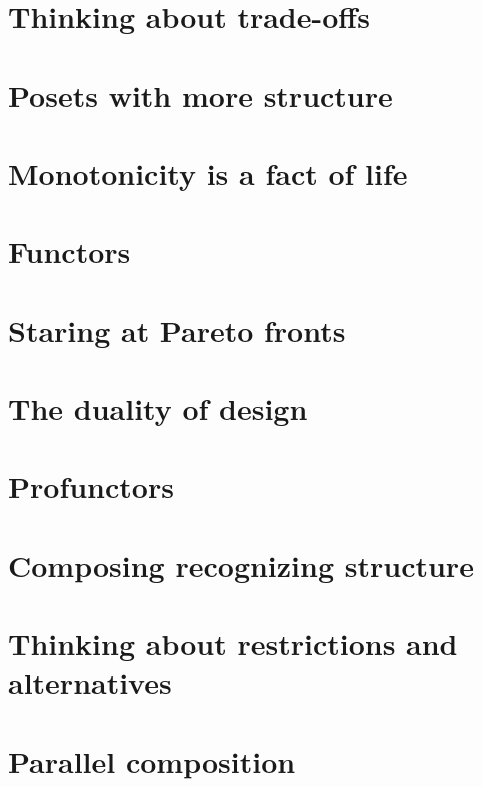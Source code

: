 \documentclass[paper=6in:9in,pagesize=pdftex,
 headinclude=off,footinclude=on,11pt,twoside]{scrbook}
\begin{document}
\chapter{Thinking about trade-offs}

\clearpage
%
\chapter{Posets with more structure}

%
\chapter{Monotonicity is a fact of life}

\clearpage
%
\chapter{Functors}

\clearpage
%
\chapter{Staring at Pareto fronts}

\clearpage
%
\chapter{The duality of design}

\clearpage
%
\chapter{Profunctors}

\clearpage
%
\chapter{Composing recognizing structure}

\clearpage
%
\chapter{Thinking about restrictions and alternatives}

\clearpage
%
\chapter{Parallel composition}

\clearpage
%
\end{document}
